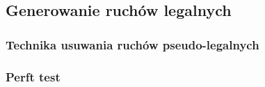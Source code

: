 \subsection{Generowanie ruchów legalnych}
\label{subsec:generowanie-ruchow-legalnych}

\subsubsection{Technika usuwania ruchów pseudo-legalnych}
\subsubsection{Perft test}